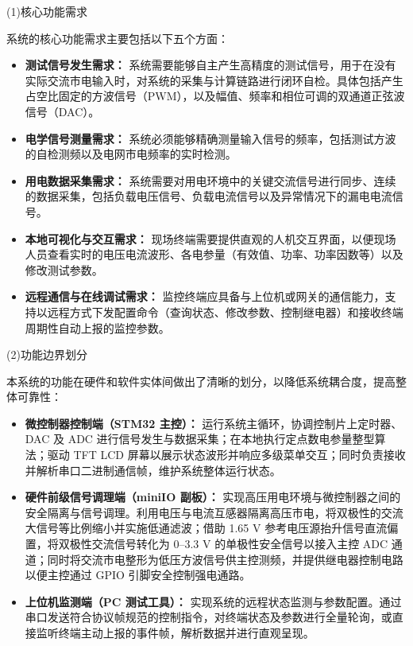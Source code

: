 \documentclass[UTF8,a4paper,zihao=-4,fontset=macnew]{ctexart}
\newcommand{\itemline}[2]{%
  {\setlength{\leftskip}{2em}\setlength{\parindent}{0pt}%
  \noindent(#1)\quad #2\par}%
}
\begin{document}
\itemline{1}{核心功能需求}

系统的核心功能需求主要包括以下五个方面：
\begin{itemize}
  \item \textbf{测试信号发生需求：} 系统需要能够自主产生高精度的测试信号，用于在没有实际交流市电输入时，对系统的采集与计算链路进行闭环自检。具体包括产生占空比固定的方波信号（PWM），以及幅值、频率和相位可调的双通道正弦波信号（DAC）。
  \item \textbf{电学信号测量需求：} 系统必须能够精确测量输入信号的频率，包括测试方波的自检测频以及电网市电频率的实时检测。
  \item \textbf{用电数据采集需求：} 系统需要对用电环境中的关键交流信号进行同步、连续的数据采集，包括负载电压信号、负载电流信号以及异常情况下的漏电电流信号。
  \item \textbf{本地可视化与交互需求：} 现场终端需要提供直观的人机交互界面，以便现场人员查看实时的电压电流波形、各电参量（有效值、功率、功率因数等）以及修改测试参数。
  \item \textbf{远程通信与在线调试需求：} 监控终端应具备与上位机或网关的通信能力，支持以远程方式下发配置命令（查询状态、修改参数、控制继电器）和接收终端周期性自动上报的监控参数。
\end{itemize}

\itemline{2}{功能边界划分}

本系统的功能在硬件和软件实体间做出了清晰的划分，以降低系统耦合度，提高整体可靠性：
\begin{itemize}
  \item \textbf{微控制器控制端（STM32 主控）：} 运行系统主循环，协调控制片上定时器、DAC 及 ADC 进行信号发生与数据采集；在本地执行定点数电参量整型算法；驱动 TFT LCD 屏幕以展示状态波形并响应多级菜单交互；同时负责接收并解析串口二进制通信帧，维护系统整体运行状态。
  \item \textbf{硬件前级信号调理端（miniIO 副板）：} 实现高压用电环境与微控制器之间的安全隔离与信号调理。利用电压与电流互感器隔离高压市电，将双极性的交流大信号等比例缩小并实施低通滤波；借助 1.65 V 参考电压源抬升信号直流偏置，将双极性交流信号转化为 0--3.3 V 的单极性安全信号以接入主控 ADC 通道；同时将交流市电整形为低压方波信号供主控测频，并提供继电器控制电路以便主控通过 GPIO 引脚安全控制强电通路。
  \item \textbf{上位机监测端（PC 测试工具）：} 实现系统的远程状态监测与参数配置。通过串口发送符合协议帧规范的控制指令，对终端状态及参数进行全量轮询，或直接监听终端主动上报的事件帧，解析数据并进行直观呈现。
\end{itemize}
\end{document}
